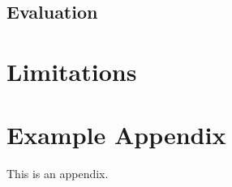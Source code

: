\documentclass[11pt]{article}
\begin{document}
\subsection{Evaluation}


\section*{Limitations}




%



\appendix

\section{Example Appendix}
\label{sec:appendix}

This is an appendix.
\end{document}
